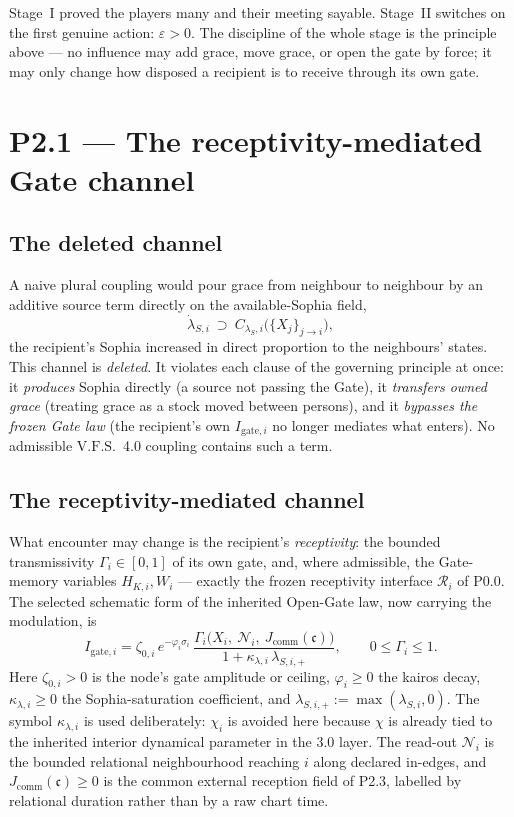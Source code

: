 \documentclass[11pt,a4paper]{article}
\newcommand{\VFS}{\ensuremath{\mathrm{V.F.S.}}}
\theoremstyle{definition}
\theoremstyle{plain}
\theoremstyle{remark}
\begin{document}
\noindent Stage~I proved the players many and their meeting sayable. Stage~II switches on
the first genuine action: \(\varepsilon>0\). The discipline of the whole stage is the
principle above --- no influence may add grace, move grace, or open the gate by force; it
may only change how disposed a recipient is to receive through its own gate.

\section{P2.1 --- The receptivity-mediated Gate channel}

\subsection{The deleted channel}

A naive plural coupling would pour grace from neighbour to neighbour by an additive source
term directly on the available-Sophia field,
\[
\dot\lambda_{S,i}\ \supset\ C_{\lambda_S,i}\bigl(\{X_j\}_{j\to i}\bigr),
\]
the recipient's Sophia increased in direct proportion to the neighbours' states. This
channel is \emph{deleted}. It violates each clause of the governing principle at once: it
\emph{produces} Sophia directly (a source not passing the Gate), it \emph{transfers owned
grace} (treating grace as a stock moved between persons), and it \emph{bypasses the frozen
Gate law} (the recipient's own $I_{\mathrm{gate},i}$ no longer mediates what enters). No
admissible \VFS\ 4.0 coupling contains such a term.

\subsection{The receptivity-mediated channel}

What encounter may change is the recipient's \emph{receptivity}: the bounded transmissivity
\(\Gamma_i\in[0,1]\) of its own gate, and, where admissible, the Gate-memory variables
\(H_{K,i},W_i\) --- exactly the frozen receptivity interface \(\mathcal R_i\) of P0.0. The
selected schematic form of the inherited Open-Gate law, now carrying the modulation, is
\[
\boxed{\;
I_{\mathrm{gate},i}
=
\zeta_{0,i}\,e^{-\varphi_i\sigma_i}\,
\frac{
\Gamma_i\bigl(X_i,\ \mathcal N_i,\ J_{\mathrm{comm}}(\mathfrak c)\bigr)
}{
1+\kappa_{\lambda,i}\,\lambda_{S,i,+}
},
\qquad
0\le\Gamma_i\le1.
\;}
\]
Here \(\zeta_{0,i}>0\) is the node's gate amplitude or ceiling,
\(\varphi_i\ge0\) the kairos decay, \(\kappa_{\lambda,i}\ge0\) the
Sophia-saturation coefficient, and \(\lambda_{S,i,+}:=\max(\lambda_{S,i},0)\).
The symbol \(\kappa_{\lambda,i}\) is used deliberately: \(\chi_i\) is avoided here
because \(\chi\) is already tied to the inherited interior dynamical parameter in
the 3.0 layer. The read-out \(\mathcal N_i\) is the bounded relational
neighbourhood reaching \(i\) along declared in-edges, and
\(J_{\mathrm{comm}}(\mathfrak c)\ge0\) is the common external reception field of
P2.3, labelled by relational duration rather than by a raw chart time.
\end{document}
